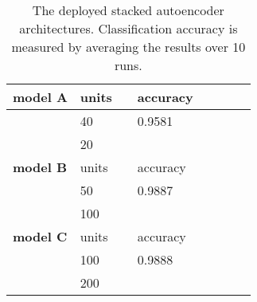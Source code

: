 \documentclass[conference,compsoc]{IEEEtran}
\begin{document}
\begin{table}
\begin{subtable}[t]{0.48\textwidth}
\centering
\begin{tabular}[t]{l l l l l l |l l}
\toprule
 \textbf{model A}  & units&    &accuracy\\
\midrule
  & 40 &  &0.9581 &\\
  & 20  & &\\
\midrule                                                  
   \textbf{model B} &units&&accuracy\\
\midrule
  & 50 &  & 0.9887 &\\
  &100  & &\\
  \midrule                                                  
   \textbf{model C} &units&&accuracy\\
\midrule
  & 100 &  & 0.9888&\\
  &200  & &\\  
\bottomrule
\end{tabular}
\end{subtable}
\caption{The deployed stacked autoencoder architectures. Classification accuracy is measured by averaging the results over 10 runs.}
\label{tableaut}
\end{table}

  





%
\end{document}
